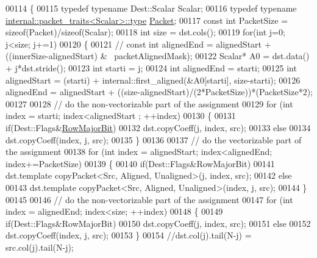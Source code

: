 \begin{DoxyCode}
00114   \{
00115     \textcolor{keyword}{typedef} \textcolor{keyword}{typename} Dest::Scalar Scalar;
00116     \textcolor{keyword}{typedef} \textcolor{keyword}{typename} \hyperlink{group___sparse_core___module}{internal::packet\_traits<Scalar>::type} 
      \hyperlink{group___sparse_core___module}{Packet};
00117     \textcolor{keyword}{const} \textcolor{keywordtype}{int} PacketSize = \textcolor{keyword}{sizeof}(Packet)/\textcolor{keyword}{sizeof}(Scalar);
00118     \textcolor{keywordtype}{int} size = dst.cols();
00119     \textcolor{keywordflow}{for}(\textcolor{keywordtype}{int} j=0; j<size; j+=1)
00120     \{
00121 \textcolor{comment}{//       const int alignedEnd = alignedStart + ((innerSize-alignedStart) & ~packetAlignedMask);}
00122       Scalar* A0 = dst.data() + j*dst.stride();
00123       \textcolor{keywordtype}{int} starti = j;
00124       \textcolor{keywordtype}{int} alignedEnd = starti;
00125       \textcolor{keywordtype}{int} alignedStart = (starti) + internal::first\_aligned(&A0[starti], size-starti);
00126       alignedEnd = alignedStart + ((size-alignedStart)/(2*PacketSize))*(PacketSize*2);
00127 
00128       \textcolor{comment}{// do the non-vectorizable part of the assignment}
00129       \textcolor{keywordflow}{for} (\textcolor{keywordtype}{int} index = starti; index<alignedStart ; ++index)
00130       \{
00131         \textcolor{keywordflow}{if}(Dest::Flags&\hyperlink{group__flags_gae4f56c2a60bbe4bd2e44c5b19cbe8762}{RowMajorBit})
00132           dst.copyCoeff(j, index, src);
00133         \textcolor{keywordflow}{else}
00134           dst.copyCoeff(index, j, src);
00135       \}
00136 
00137       \textcolor{comment}{// do the vectorizable part of the assignment}
00138       \textcolor{keywordflow}{for} (\textcolor{keywordtype}{int} index = alignedStart; index<alignedEnd; index+=PacketSize)
00139       \{
00140         \textcolor{keywordflow}{if}(Dest::Flags&RowMajorBit)
00141           dst.template copyPacket<Src, Aligned, Unaligned>(j, index, src);
00142         \textcolor{keywordflow}{else}
00143           dst.template copyPacket<Src, Aligned, Unaligned>(index, j, src);
00144       \}
00145 
00146       \textcolor{comment}{// do the non-vectorizable part of the assignment}
00147       \textcolor{keywordflow}{for} (\textcolor{keywordtype}{int} index = alignedEnd; index<size; ++index)
00148       \{
00149         \textcolor{keywordflow}{if}(Dest::Flags&RowMajorBit)
00150           dst.copyCoeff(j, index, src);
00151         \textcolor{keywordflow}{else}
00152           dst.copyCoeff(index, j, src);
00153       \}
00154       \textcolor{comment}{//dst.col(j).tail(N-j) = src.col(j).tail(N-j);}

\end{DoxyCode}
